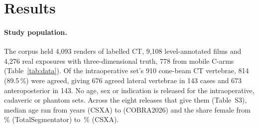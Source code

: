 \section*{Results}

\paragraph{Study population.}
The corpus held 4,093 renders of labelled CT, 9,108 level-annotated films and 4,276 real exposures with
three-dimensional truth, 778 from mobile C-arms (Table~\ref{tab:data}). Of the intraoperative set's 910 cone-beam
CT vertebrae, 814 (89.5\,\%) were agreed, giving 676 agreed lateral vertebrae in 143 cases and 673
anteroposterior in 143. No age, sex or indication is released for the intraoperative, cadaveric or phantom sets.
Across the eight releases that give them (Table~S3), median age ran from  years (CSXA) to
 (COBRA2026) and the share female from \,\%
(TotalSegmentator) to \,\% (CSXA).


